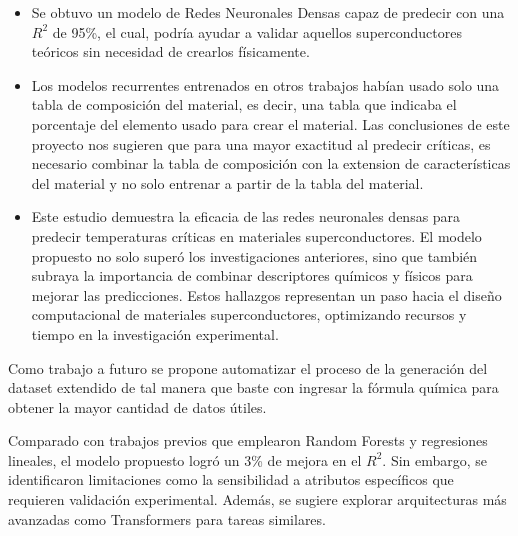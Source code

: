 \documentclass[conference]{IEEEtran} %
\begin{document}
\begin{itemize}
    \item Se obtuvo un modelo de Redes Neuronales Densas capaz de 
    predecir con una $R^2$ de 95\%, el cual, podría ayudar a validar
    aquellos superconductores teóricos sin necesidad de crearlos físicamente.
    \item Los modelos recurrentes entrenados en otros trabajos 
    habían usado solo una tabla de composición del material, es 
    decir, una tabla que indicaba el porcentaje del 
    elemento usado para crear el material. Las conclusiones de este proyecto
    nos sugieren que para una mayor exactitud al predecir 
    críticas, es necesario combinar la tabla de composición con 
    la extension de características del material y no solo entrenar a partir
    de la tabla del material.
    \item Este estudio demuestra la eficacia de las redes neuronales 
    densas para predecir temperaturas críticas en materiales 
    superconductores. El modelo propuesto no solo superó los investigaciones 
    anteriores, sino que también subraya la importancia de combinar 
    descriptores químicos y físicos para mejorar las predicciones. Estos 
    hallazgos representan un paso hacia el diseño computacional de 
    materiales superconductores, optimizando recursos y tiempo en la 
    investigación experimental.
    
\end{itemize}

Como trabajo a futuro se propone automatizar el proceso de la
generación del dataset extendido de tal manera que baste con ingresar la f\'ormula
química para obtener la mayor cantidad de datos útiles.

Comparado con trabajos previos que emplearon Random Forests y regresiones 
lineales, el modelo propuesto logró un 3\% de mejora en el $R^2$. Sin 
embargo, se identificaron limitaciones como la sensibilidad a atributos 
específicos que requieren validación experimental. Además, se sugiere 
explorar arquitecturas más avanzadas como Transformers para tareas 
similares.


\end{document}
